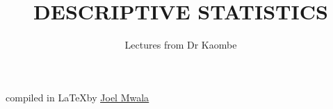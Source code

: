 \documentclass[12pt]{report}
\title{DESCRIPTIVE STATISTICS}
\author{Lectures from Dr Kaombe}
\begin{document}
\maketitle
\vspace*{11cm}
\begin{center}
    compiled in \LaTeX \nobreakspace by \href{https://bento.me/joelmwala}{\underline{Joel Mwala}}
\end{center}

\newpage
\tableofcontents


\newpage









\end{document}
